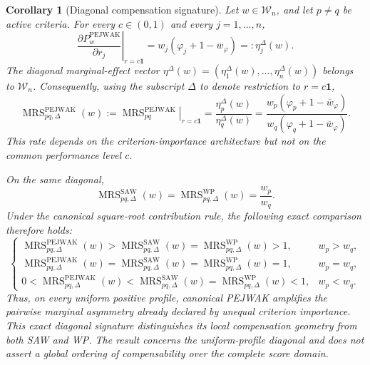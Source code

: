 \documentclass[reqno,11pt]{amsart}
\theoremstyle{definition}
\theoremstyle{plain}
\newtheorem{corollary}{Corollary}
\theoremstyle{remark}
\begin{document}
\begin{corollary}[Diagonal compensation signature]
Let $w\in\mathcal W_n$, and let $p\neq q$ be active criteria. For every
$c\in(0,1)$ and every $j=1,\ldots,n$,
\begin{equation}
\left.
\frac{\partial P_w^{\mathrm{PEJWAK}}}
{\partial r_j}
\right|_{r=c\mathbf 1}
=
w_j
\left(
\varphi_j+1-\overline w_\varphi
\right)
=:
\eta_j^\Delta(w).
\label{eq:diagonal-gradient}
\end{equation}
The diagonal marginal-effect vector
$\eta^\Delta(w)=(\eta_1^\Delta(w),\ldots,\eta_n^\Delta(w))$
belongs to $\mathcal W_n$. Consequently, using the subscript
$\Delta$ to denote restriction to $r=c\mathbf1$,
\begin{equation}
\operatorname{MRS}_{pq,\Delta}^{\mathrm{PEJWAK}}(w)
:=
\left.
\operatorname{MRS}_{pq}^{\mathrm{PEJWAK}}
\right|_{r=c\mathbf 1}
=
\frac{\eta_p^\Delta(w)}{\eta_q^\Delta(w)}
=
\frac{
w_p(\varphi_p+1-\overline w_\varphi)
}{
w_q(\varphi_q+1-\overline w_\varphi)
}.
\label{eq:diagonal-mrs}
\end{equation}
This rate depends on the criterion-importance architecture but not on
the common performance level $c$.

On the same diagonal,
\begin{equation}
\operatorname{MRS}_{pq,\Delta}^{\mathrm{SAW}}(w)
=
\operatorname{MRS}_{pq,\Delta}^{\mathrm{WP}}(w)
=
\frac{w_p}{w_q}.
\label{eq:diagonal-benchmark-mrs}
\end{equation}
Under the canonical square-root contribution rule, the following exact
comparison therefore holds:
\[
\begin{cases}
\operatorname{MRS}_{pq,\Delta}^{\mathrm{PEJWAK}}(w)
>
\operatorname{MRS}_{pq,\Delta}^{\mathrm{SAW}}(w)
=
\operatorname{MRS}_{pq,\Delta}^{\mathrm{WP}}(w)
>1,
& w_p>w_q,\\[1mm]
\operatorname{MRS}_{pq,\Delta}^{\mathrm{PEJWAK}}(w)
=
\operatorname{MRS}_{pq,\Delta}^{\mathrm{SAW}}(w)
=
\operatorname{MRS}_{pq,\Delta}^{\mathrm{WP}}(w)
=1,
& w_p=w_q,\\[1mm]
0<
\operatorname{MRS}_{pq,\Delta}^{\mathrm{PEJWAK}}(w)
<
\operatorname{MRS}_{pq,\Delta}^{\mathrm{SAW}}(w)
=
\operatorname{MRS}_{pq,\Delta}^{\mathrm{WP}}(w)
<1,
& w_p<w_q.
\end{cases}
\]
Thus, on every uniform positive profile, canonical PEJWAK amplifies the
pairwise marginal asymmetry already declared by unequal criterion
importance. This exact diagonal signature distinguishes its local
compensation geometry from both SAW and WP. The result concerns the
uniform-profile diagonal and does not assert a global ordering of
compensability over the complete score domain.
\end{corollary}
\end{document}
